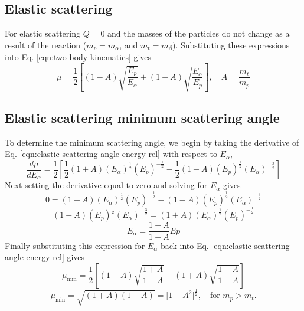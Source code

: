 \documentclass[../main.tex]{subfiles}
\begin{document}
\subsection{Elastic scattering}
For elastic scattering $Q = 0$ and the masses of the particles do not change as a result of the reaction ($m_p = m_{\alpha}$, and $m_t = m_{\beta}$). Substituting these expressions into Eq. \eqref{eqn:two-body-kinematics} gives
\begin{equation} \label{eqn:elastic-scattering-angle-energy-rel}
  \boxed{\mu = \dfrac{1}{2} \left[\left(1 - A\right)\sqrt{\dfrac{E_p}{E_{\alpha}}} + \left(1 + A\right)\sqrt{\dfrac{E_{\alpha}}{E_p}}\right], \quad A = \dfrac{m_t}{m_p}}
\end{equation}

\subsection{Elastic scattering minimum scattering angle}
To determine the minimum scattering angle, we begin by taking the derivative of Eq. \eqref{eqn:elastic-scattering-angle-energy-rel} with respect to $E_{\alpha}$,
\begin{equation}
  \dfrac{d \mu}{d E_{\alpha}} = \dfrac{1}{2} \left[\frac{1}{2}\left(1 + A\right)(E_{\alpha})^{\frac{1}{2}}(E_p)^{-\frac{1}{2}} - \frac{1}{2}\left(1 - A\right)(E_p)^{\frac{1}{2}}(E_{\alpha})^{-\frac{3}{2}}\right]
\end{equation}
Next setting the derivative equal to zero and solving for $E_{\alpha}$ gives
\begin{equation}
  0 = \left(1 + A\right)(E_{\alpha})^{\frac{1}{2}}(E_p)^{-\frac{1}{2}} - \left(1 - A\right)(E_p)^{\frac{1}{2}}(E_{\alpha})^{-\frac{3}{2}}
\end{equation}
\begin{equation}
  \left(1 - A\right)(E_p)^{\frac{1}{2}}(E_{\alpha})^{-\frac{3}{2}} = \left(1 + A\right)(E_{\alpha})^{\frac{1}{2}}(E_p)^{-\frac{1}{2}}
\end{equation}
\begin{equation}
  E_{\alpha} = \dfrac{1-A}{1+A} Ep
\end{equation}
Finally substituting this expression for $E_{\alpha}$ back into Eq. \eqref{eqn:elastic-scattering-angle-energy-rel} gives
\begin{equation}
  \mu_{\text{min}} = \dfrac{1}{2} \left[\left(1 - A\right)\sqrt{\dfrac{1+A}{1-A}} + \left(1 + A\right)\sqrt{\dfrac{1-A}{1+A}}\right]
\end{equation}
\begin{equation}
  \boxed{\mu_{\text{min}} = \sqrt{(1+A)(1-A)} = \Big[1 - A^2\Big]^{\frac{1}{2}}, \quad \text{for} \,\, m_p > m_t}.
\end{equation}
\end{document}
